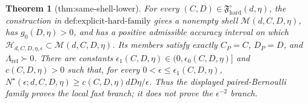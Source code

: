 \documentclass{article}
\newtheorem{theorem}{Theorem}
\begin{document}
\begin{theorem}[thm:same-shell-lower]\label{thm:same-shell-lower}
For every \((C,D)\in\mathfrak F_{\mathrm{hard}}^\circ(d,\eta)\), the construction in \(\text{def:explicit-hard-family}\) gives a nonempty shell \(\mathcal M(d,C,D,\eta)\), has \(g_0(D,\eta)>0\), and has a positive admissible accuracy interval on which \(\mathcal H_{d,C,D,\eta,\epsilon}\subset\mathcal M(d,C,D,\eta)\). Its members satisfy exactly \(C_P=C\), \(D_P=D\), and \(\Lambda_{\mathrm{ref}}\succ0\). There are constants \(\epsilon_1(C,D,\eta)\in(0,\epsilon_0(C,D,\eta)]\) and \(c(C,D,\eta)>0\) such that, for every \(0<\epsilon\le\epsilon_1(C,D,\eta)\), \(N^\star(\epsilon;d,C,D,\eta)\ge c(C,D,\eta)dD\eta/\epsilon\). Thus the displayed paired-Bernoulli family proves the local fast branch; it does not prove the \(\epsilon^{-2}\) branch.
\end{theorem}
\end{document}
